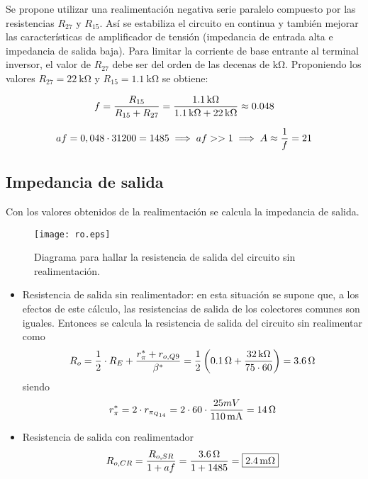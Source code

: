 	Se propone utilizar una realimentación negativa serie paralelo compuesto por las resistencias $R_{27}$ y $R_{15}$. Así se estabiliza el circuito en continua y también mejorar las características de amplificador de tensión (impedancia de entrada alta e impedancia de salida baja). Para limitar la corriente de base entrante al terminal inversor, el valor de $R_{27}$ debe ser del orden de las decenas de \si{\kilo\ohm}. Proponiendo los valores $R_{27}=\SI{22}{\kilo\ohm}$ y $R_{15}=\SI{1.1}{\kilo\ohm}$ se obtiene:

\begin{equation}
	\centering
	f = \frac{R_{15}}{R_{15} + R_{27}} = \frac{\SI{1.1}{\kilo\ohm}}{\SI{1.1}{\kilo\ohm} + \SI{22}{\kilo\ohm}} \approx \num{0.048}
\end{equation}

\begin{equation}
	\centering
	af = 0,048 \cdot 31200 = 1485 \implies af >> 1 \implies A \approx \frac{1}{f} = 21
\end{equation}

\subsection{Impedancia de salida}
	Con los valores obtenidos de la realimentación se calcula la impedancia de salida.

\begin{figure}[H]
	 \centering
	 \texttt{[image: ro.eps]}
	 \caption{Diagrama para hallar la resistencia de salida del circuito sin realimentación.}
\end{figure}

\begin{itemize}
	\item Resistencia de salida sin realimentador: en esta situación se supone que, a los efectos de este cálculo, las resistencias de salida de los colectores comunes son iguales.
Entonces se calcula la resistencia de salida del circuito sin realimentar como
	\begin{equation}
		\centering
		R_o = \frac{1}{2} \cdot R_E + \frac{ r_{\pi}^{*} + r_{o,Q9} }{\beta^{*} } = \frac{1}{2} \left ( \SI{0.1}{\ohm} + \frac{\SI{32}{\kilo\ohm}}{75 \cdot 60} \right) = \SI{3.6}{\ohm}
	\end{equation}
	siendo
	\begin{equation}
		\centering
		r_{\pi}^{*} = 2 \cdot r_{\pi_{Q_{14}}} = 2 \cdot 60 \cdot \frac{25mV}{ \SI{110}{\milli\ampere}} = \SI{14}{\ohm} 
	\end{equation}
		
		
	\item Resistencia de salida con realimentador
	\begin{equation}
		\centering
		R_{o,CR} = \frac{R_{o,SR}}{1+ af} = \frac{ \SI{3.6}{\ohm} }{1+1485} = \boxed{\SI{2.4}{\milli\ohm}} 
	\end{equation}
\end{itemize}


